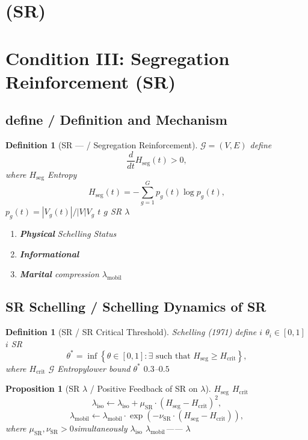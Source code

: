 \documentclass[11pt,a4paper]{article}
\newtheorem{proposition}[theorem]{Proposition}
\newtheorem{definition}[theorem]{Definition}
\theoremstyle{remark}
\newcommand{\paren}[1]{\left(#1\right)}
\newcommand{\set}[1]{\left\{#1\right\}}
\newcommand{\lambdaparam}{\lambda}
\begin{document}
\section{ (SR)}
\section{Condition III: Segregation Reinforcement (SR)}

\subsection{define / Definition and Mechanism}

\begin{definition}[SR —  / Segregation Reinforcement]
\label{def:SR}
 $\mathcal{G} = (V, E)$
define
\[
\frac{d}{dt} H_{\text{seg}}(t) > 0,
\]
where $H_{\text{seg}}$ Entropy
\[
H_{\text{seg}}(t) = -\sum_{g=1}^{G} p_g(t) \log p_g(t),
\]
$p_g(t) = |V_g(t)| / |V|$$V_g$  $t$  $g$ 
SR  $\lambdaparam$
\begin{enumerate}
    \item \textbf{Physical} 
           Schelling Status
    \item \textbf{Informational} 
          
    \item \textbf{Marital} 
          compression $\lambdaparam_{\text{mobil}}$
\end{enumerate}
\end{definition}

\subsection{SR  Schelling  / Schelling Dynamics of SR}

\begin{definition}[SR  / SR Critical Threshold]
\label{def:SR_critical}
 Schelling (1971) define $i$ \textbf{} $\theta_i \in [0,1]$
 $i$ SR 
\[
\theta^* = \inf \set{\theta \in [0,1] : \exists \text{ such that } H_{\text{seg}} \geq H_{\text{crit}}},
\]
where $H_{\text{crit}}$  $\mathcal{G}$ Entropylower bound
 $\theta^*$  $0.3$--$0.5$ 
\end{definition}

\begin{proposition}[SR  $\lambdaparam$  / Positive Feedback of SR on $\lambdaparam$]
\label{prop:SR_lambda}
 $H_{\text{seg}}$  $H_{\text{crit}}$ 
\[
\lambdaparam_{\text{iso}} \leftarrow \lambdaparam_{\text{iso}} + 
\mu_{\text{SR}} \cdot (H_{\text{seg}} - H_{\text{crit}})^2,
\]
\[
\lambdaparam_{\text{mobil}} \leftarrow \lambdaparam_{\text{mobil}} \cdot 
\exp\paren{-\nu_{\text{SR}} \cdot (H_{\text{seg}} - H_{\text{crit}})},
\]
where $\mu_{\text{SR}}, \nu_{\text{SR}} > 0$simultaneously $\lambdaparam_{\text{iso}}$
 $\lambdaparam_{\text{mobil}}$—— $\lambdaparam$ 
\end{proposition}
\end{document}
